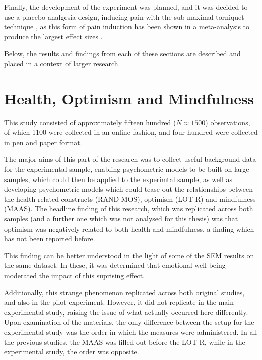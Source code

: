 Finally, the development of the experiment was planned, and it was decided to use a placebo analgesia design, inducing pain with the sub-maximal torniquet technique \cite{moore1979submaximal}, as this form of pain induction has been shown in a meta-analysis to produce the largest effect sizes \cite{Sauro2005}. 

Below, the results and findings from each of these sections are described and placed in a context of larger research. 

\section{Health, Optimism and Mindfulness}
\label{sec:health-optim-mindf}

This study consisted of approximately fifteen hundred ($N \approx 1500$) observations, of which 1100 were collected in an online fashion, and four hundred were collected in pen and paper format. 

The major aims of this part of the research was to collect useful background data for the experimental sample, enabling psychometric models to be built on large samples, which could then be applied to the experimtal sample, as well as developing psychometric models which could tease out the relationships between the health-related constructs (RAND MOS), optimism (LOT-R) and mindfulness (MAAS). The headline finding of this research, which was replicated across both samples (and a further one which was not analysed for this thesis) was that optimism was negatively related to both health and mindfulness, a finding which has not been reported before. 

This finding can be better understood in the light of some of the SEM results on the same dataset. In these, it was determined that emotional well-being moderated the impact of this suprising effect. 


Additionally, this strange phenomenon replicated across both original studies, and also in the pilot experiment. However, it did not replicate in the main experimental study, raising the issue of what actually occurred here differently. Upon examination of the materials, the only difference between the setup for the experimental study was the order in which the measures were administered. In all the previous studies, the MAAS was filled out before the LOT-R, while in the experimental study, the order was opposite. 

